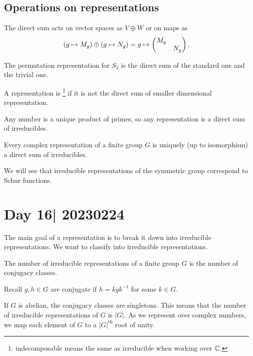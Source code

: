 \documentclass[12pt]{memoir}
\begin{document}
\subsection{Operations on representations}

The direct sum acts on vector spaces as $V\oplus W$ or on maps as 
$$(g\mapsto M_g)\oplus(g\mapsto N_g)=g\mapsto\begin{pmatrix} M_g &  \\  & N_g \end{pmatrix}.$$

\begin{Ex}
    The permutation representation for $S_3$ is the direct sum of the standard one and the trivial one.
\end{Ex}

\begin{Def}
    A representation is \footnote{indecomposable means the same as irreducible when working over $\mathbb{C}$.} if it is not the direct sum of smaller dimensional representation.
\end{Def}
Any number is a unique product of primes, so any representation is a direct sum of irreducibles.

\begin{Th}
    Every complex representation of a finite group $G$ is uniquely (up to isomorphism) a direct sum of irreducibles.
\end{Th}

We will see that irreducible representations of the symmetric group correspond to Schur functions. 

\section{Day 16| 20230224}

The main goal of a representation is to break it down into irreducible representations. We want to classify into irreducible representations.

\begin{Prop}
    The number of irreducible representations of a finite group $G$ is the number of conjugacy classes.
\end{Prop}

Recall $g,h\in G$ are conjugate if $h=kgk^{-1}$ for some $k\in G$. 

\begin{Ex}
    If $G$ is abelian, the conjugacy classes are singletons. This means that the number of irreducible representations of $G$ is $|G|$. As we represent over complex numbers, we map each element of $G$ to a $|G|^{\text{th}}$ root of unity.
\end{Ex}
\end{document}
